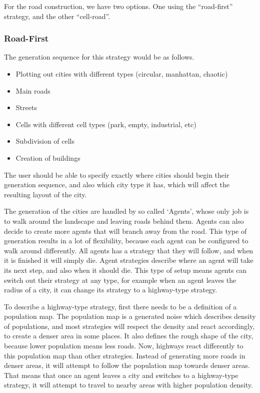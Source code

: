 For the road construction, we have two options.
One using the “road-first” strategy, and the other “cell-road”.

\subsubsection{Road-First}
The generation sequence for this strategy would be as follows.
\begin{itemize}
  \item Plotting out cities with different types (circular, manhattan, chaotic)
  \item Main roads
  \item Streets
  \item Cells with different cell types (park, empty, industrial, etc)
  \item Subdivision of cells
  \item Creation of buildings
\end{itemize}

The user should be able to specify exactly where cities should begin their generation sequence,
and also which city type it has, which will affect the resulting layout of the city.

The generation of the cities are handled by so called `Agents', whose only job is to walk around the landscape and leaving roads behind them.
Agents can also decide to create more agents that will branch away from the road.
This type of generation results in a lot of flexibility, because each agent can be configured to walk around differently.
All agents has a strategy that they will follow, and when it is finished it will simply die.
Agent strategies describe where an agent will take its next step, and also when it should die.
This type of setup means agents can switch out their strategy at any type, for example when an agent leaves the radius of a city, it can change its strategy to a highway-type strategy.

To describe a highway-type strategy, first there needs to be a definition of a population map. The population map is a generated noise which describes density of populations, and most strategies
will respect the density and react accordingly, to create a denser area in some places. It also defines the rough shape of the city, because lower population means less roads.
Now, highways react differently to this population map than other strategies. Instead of generating more roads in denser areas, it will attempt to follow the population map towards denser areas.
That means that once an agent leaves a city and switches to a highway-type strategy, it will attempt to travel to nearby areas with higher population density.

